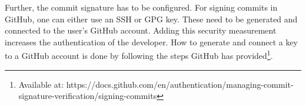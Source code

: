 Further, the commit signature has to be configured. For signing commits in GitHub, one can either use an SSH or GPG key. These need to be generated and connected to the user's GitHub account. Adding this security measurement increases the authentication of the developer. How to generate and connect a key to a GitHub account is done by following the steps GitHub has provided\footnote{Available at: https://docs.github.com/en/authentication/managing-commit-signature-verification/signing-commits}.

